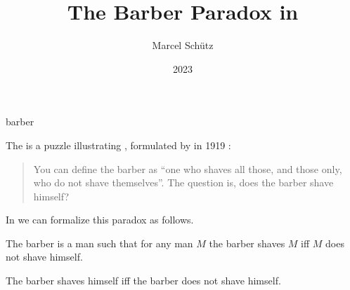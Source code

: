 \documentclass{stex}
\begin{document}
\title{The Barber Paradox in \Naproche}
\author{Marcel Schütz}
\date{2023}
\maketitle
\begin{smodule}{barber}
\begin{sparagraph}[style=symdoc]
  The \emph{} is a puzzle illustrating , formulated by  in 1919 \cite[p. 355]{Russell1919}:

  \begin{quotation}
    \noindent You can define the barber as “one who shaves all those, and those only, who do not shave themselves”.
    The question is, does the barber shave himself?
  \end{quotation}
\end{sparagraph}

\begin{sparagraph}
  In \Naproche we can formalize this paradox as follows.

  \begin{forthel}

    \begin{signature*}
      The barber is a man such that for any man $M$ the barber shaves $M$ iff $M$ does not shave himself.
    \end{signature*}

    \begin{theorem*}\label{barber_paradox}
      The barber shaves himself iff the barber does not shave himself.
    \end{theorem*}
  \end{forthel}
\end{sparagraph}
\end{smodule}
\printbibliography
\end{document}

